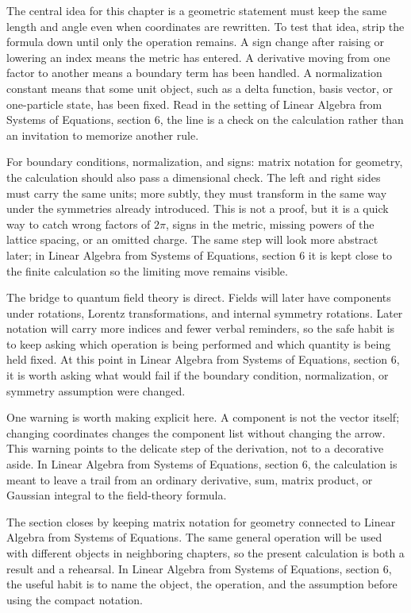 The central idea for this chapter is a geometric statement must keep the same length and angle even when coordinates are rewritten.  To test that idea, strip the formula down until only the operation remains.  A sign change after raising or lowering an index means the metric has entered.  A derivative moving from one factor to another means a boundary term has been handled.  A normalization constant means that some unit object, such as a delta function, basis vector, or one-particle state, has been fixed.  Read in the setting of Linear Algebra from Systems of Equations, section 6, the line is a check on the calculation rather than an invitation to memorize another rule.

For boundary conditions, normalization, and signs: matrix notation for geometry, the calculation should also pass a dimensional check.  The left and right sides must carry the same units; more subtly, they must transform in the same way under the symmetries already introduced.  This is not a proof, but it is a quick way to catch wrong factors of \(2\pi\), signs in the metric, missing powers of the lattice spacing, or an omitted charge.  The same step will look more abstract later; in Linear Algebra from Systems of Equations, section 6 it is kept close to the finite calculation so the limiting move remains visible.

The bridge to quantum field theory is direct.  Fields will later have components under rotations, Lorentz transformations, and internal symmetry rotations.  Later notation will carry more indices and fewer verbal reminders, so the safe habit is to keep asking which operation is being performed and which quantity is being held fixed.  At this point in Linear Algebra from Systems of Equations, section 6, it is worth asking what would fail if the boundary condition, normalization, or symmetry assumption were changed.

One warning is worth making explicit here.  A component is not the vector itself; changing coordinates changes the component list without changing the arrow.  This warning points to the delicate step of the derivation, not to a decorative aside.  In Linear Algebra from Systems of Equations, section 6, the calculation is meant to leave a trail from an ordinary derivative, sum, matrix product, or Gaussian integral to the field-theory formula.

The section closes by keeping matrix notation for geometry connected to Linear Algebra from Systems of Equations.  The same general operation will be used with different objects in neighboring chapters, so the present calculation is both a result and a rehearsal.  In Linear Algebra from Systems of Equations, section 6, the useful habit is to name the object, the operation, and the assumption before using the compact notation.



